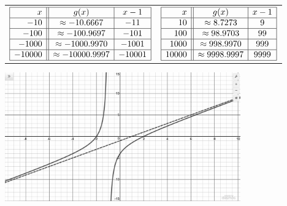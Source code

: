 \documentclass{ximera}
\begin{document}
\begin{center}
\begin{tabular}{cc}

$\begin{array}{|r||c|c|}  \hline

  x & g(x) & x-1 \\ \hline
 -10 & \approx -10.6667 & -11 \\  \hline
 -100 & \approx -100.9697 & -101 \\  \hline 
 -1000 &  \approx -1000.9970&   -1001 \\ \hline 
  -10000 &  \approx -10000.9997 &  -10001 \\ \hline 
  \end{array} $ & 

$\begin{array}{|r||c|c|}  \hline

  x & g(x) & x-1 \\ \hline
 10 & \approx 8.7273 &    9 \\\hline
 100 & \approx 98.9703 &   99 \\ \hline 
 1000 &  \approx 998.9970 &  999 \\ \hline 
  10000 &  \approx 9998.9997 &   9999 \\ \hline 
  \end{array} $ \\
  
  \end{tabular}
  \end{center}
  
  
\begin{center}
   
\includegraphics[width=4in]{./IntroRationalGraphics/SAEx01.jpg}

\end{center}
 
\end{document}
